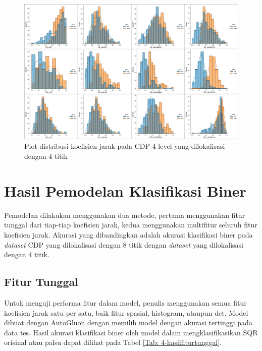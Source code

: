 \begin{figure}[!h]
	\centering
	\includegraphics[width=\textwidth]{contents/chapter-4/4-orivsfake4titik.png}
	\caption{Plot distribusi koefisien jarak pada CDP 4 level yang dilokalisasi dengan 4 titik}
	\label{Fig: 4-orivsfake4titik}
\end{figure}

\clearpage


\section{Hasil Pemodelan Klasifikasi Biner}
Pemodelan dilakukan menggunakan dua metode, pertama menggunakan fitur tunggal dari tiap-tiap koefisien jarak, kedua menggunakan multifitur seluruh fitur
koefisien jarak. Akurasi yang dibandingkan adalah akurasi klasifikasi biner pada \emph{dataset} CDP yang dilokalisasi dengan 8 titik dengan \emph{dataset} yang
dilokalisasi dengan 4 titik.

\subsection{Fitur Tunggal}
Untuk menguji performa fitur dalam model, penulis menggunakan semua fitur koefisien jarak satu per satu, baik fitur spasial, histogram, ataupun dct. Model
dibuat dengan AutoGluon dengan memilih model dengan akurasi tertinggi pada data tes. Hasil akurasi klasifikasi biner oleh model dalam mengklasifikasikan SQR
orisinal atau palsu dapat dilihat pada Tabel \ref{Tab: 4-hasilfiturtunggal}.

